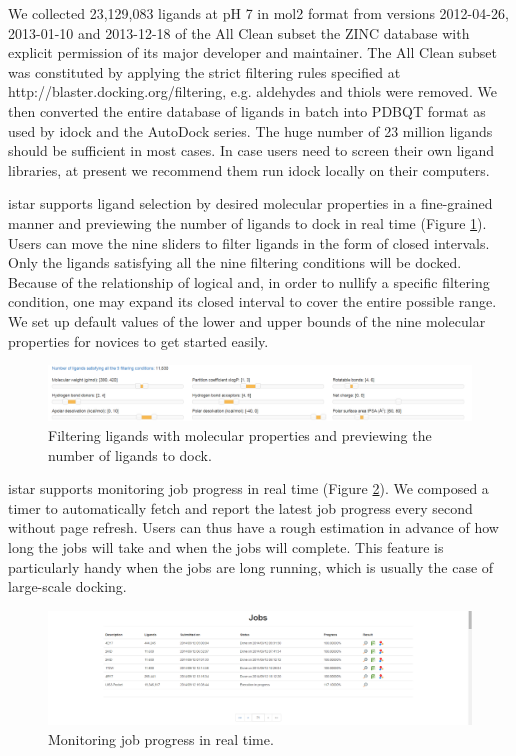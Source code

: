We collected 23,129,083 ligands at pH 7 in mol2 format from versions 2012-04-26, 2013-01-10 and 2013-12-18 of the All Clean subset the ZINC database \citep{532,1178} with explicit permission of its major developer and maintainer. The All Clean subset was constituted by applying the strict filtering rules specified at http://blaster.docking.org/filtering, e.g. aldehydes and thiols were removed. We then converted the entire database of ligands in batch into PDBQT format as used by idock and the AutoDock series. The huge number of 23 million ligands should be sufficient in most cases. In case users need to screen their own ligand libraries, at present we recommend them run idock locally on their computers.

istar supports ligand selection by desired molecular properties in a fine-grained manner and previewing the number of ligands to dock in real time (Figure \ref{istar:Filters}). Users can move the nine sliders to filter ligands in the form of closed intervals. Only the ligands satisfying all the nine filtering conditions will be docked. Because of the relationship of logical and, in order to nullify a specific filtering condition, one may expand its closed interval to cover the entire possible range. We set up default values of the lower and upper bounds of the nine molecular properties for novices to get started easily.

\begin{figure}
\centering
\includegraphics[width=\linewidth]{../istar/Filters.png}
\caption{Filtering ligands with molecular properties and previewing the number of ligands to dock.}
\label{istar:Filters}
\end{figure}

istar supports monitoring job progress in real time (Figure \ref{istar:Progress}). We composed a timer to automatically fetch and report the latest job progress every second without page refresh. Users can thus have a rough estimation in advance of how long the jobs will take and when the jobs will complete. This feature is particularly handy when the jobs are long running, which is usually the case of large-scale docking.

\begin{figure}
\centering
\includegraphics[width=\linewidth]{../istar/Progress.png}
\caption{Monitoring job progress in real time.}
\label{istar:Progress}
\end{figure}

